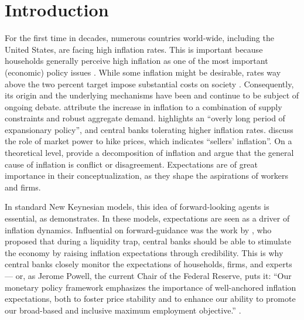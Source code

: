 \section{Introduction}\label{sec:Intro}

For the first time in decades, numerous countries world-wide, including the United States, are facing high inflation rates. This is important because households generally perceive high inflation as one of the most important (economic) policy issues \citep{Shiller.1997, Stantcheva.2024}. While some inflation might be desirable, rates way above the two percent target impose substantial costs on society \citep{Romer.2012}. Consequently, its origin and the underlying mechanisms have been and continue to be subject of ongoing debate. \cite{Blanchard.2023} attribute the increase in inflation to a combination of supply constraints and robust aggregate demand. \cite{Reis.2022} highlights an ``overly long period of expansionary policy'', and central banks tolerating higher inflation rates. \cite{Weber.2023} discuss the role of market power to hike prices, which indicates ``sellers' inflation''. On a theoretical level, \cite{Werning.2023} provide a decomposition of inflation and argue that the general cause of inflation is conflict or disagreement. Expectations are of great importance in their conceptualization, as they shape the aspirations of workers and firms.


In standard New Keynesian models, this idea of forward-looking agents is essential, as \cite{Werning.2022} demonstrates. In these models, expectations are seen as a driver of inflation dynamics. Influential on forward-guidance was the work by \cite{Krugman.1998}, who proposed that during a liquidity trap, central banks should be able to stimulate the economy by raising inflation expectations through credibility. This is why central banks closely monitor the expectations of households, firms, and experts— or, as Jerome Powell, the current Chair of the Federal Reserve, puts it: ``Our monetary policy framework emphasizes the importance of well-anchored inflation expectations, both to foster price stability and to enhance our ability to promote our broad-based and inclusive maximum employment objective.'' \citep{Powell.2021}. 


